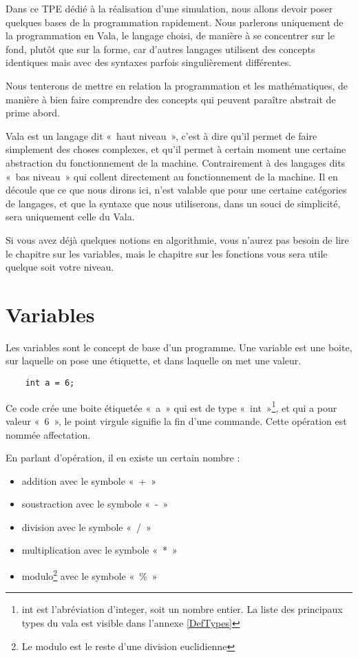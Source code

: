 Dans ce TPE dédié à la réalisation d'une simulation, nous allons devoir poser quelques bases de la programmation rapidement. Nous parlerons uniquement de la programmation en Vala, le langage choisi, de manière à se concentrer sur le fond, plutôt que sur la forme, car d'autres langages utilisent des concepts identiques mais avec des syntaxes parfois singulièrement différentes.

Nous tenterons de mettre en relation la programmation et les mathématiques, de manière à bien faire comprendre des concepts qui peuvent paraître abstrait de prime abord.

Vala est un langage dit «~haut niveau~», c'est à dire qu'il permet de faire simplement des choses complexes, et qu'il permet à certain moment une certaine abstraction du fonctionnement de la machine. Contrairement à des langages dits «~bas niveau~» qui collent directement au fonctionnement de la machine. Il en découle que ce que nous dirons ici, n'est valable que pour une certaine catégories de langages, et que la syntaxe que nous utiliserons, dans un souci de simplicité, sera uniquement celle du Vala.

Si vous avez déjà quelques notions en algorithmie, vous n'aurez pas besoin de lire le chapitre sur les variables, mais le chapitre sur les fonctions vous sera utile quelque soit votre niveau.

\section{Variables}
  Les variables sont le concept de base d'un programme. Une variable est une boite, sur laquelle on pose une étiquette, et dans laquelle on met une valeur. 
  \begin{lstlisting}
    int a = 6;
  \end{lstlisting}
  Ce code crée une boite étiquetée «~a~» qui est de type «~int~»\footnote{int est l'abréviation d'integer, soit un nombre entier. La liste des principaux types du vala est visible dans l'annexe \ref{DefTypes}}, et qui a pour valeur «~6~», le point virgule signifie la fin d'une commande. Cette opération est nommée affectation.
  
  En parlant d'opération, il en existe un certain nombre : 
  \begin{itemize}
    \item addition avec le symbole «~+~»
    \item soustraction avec le symbole «~-~»
    \item division avec le symbole «~/~»
    \item multiplication avec le symbole «~*~»
    \item modulo\footnote{Le modulo est le reste d'une division euclidienne} avec le symbole «~\%~»
  \end{itemize}
  
